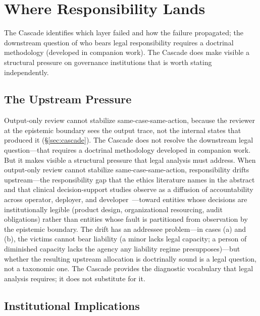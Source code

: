 \section{Where Responsibility Lands}\label{sec:responsibility}

The Cascade identifies which layer failed and how the failure propagated; the downstream question of who bears legal responsibility requires a doctrinal methodology (developed in companion work). The Cascade does make visible a structural pressure on governance institutions that is worth stating independently.

\subsection{The Upstream Pressure}

Output-only review cannot stabilize same-case-same-action, because the reviewer at the epistemic boundary sees the output trace, not the internal states that produced it (\S\ref{sec:cascade}). The Cascade does not resolve the downstream legal question---that requires a doctrinal methodology developed in companion work. But it makes visible a structural pressure that legal analysis must address. When output-only review cannot stabilize same-case-same-action, responsibility drifts upstream---the responsibility gap that the ethics literature names in the abstract~\cite{konigs2022} and that clinical decision-support studies observe as a diffusion of accountability across operator, deployer, and developer~\cite{bleher2022}---toward entities whose decisions are institutionally legible (product design, organizational resourcing, audit obligations) rather than entities whose fault is partitioned from observation by the epistemic boundary. The drift has an addressee problem---in cases (a) and (b), the victims cannot bear liability (a minor lacks legal capacity; a person of diminished capacity lacks the agency any liability regime presupposes)---but whether the resulting upstream allocation is doctrinally sound is a legal question, not a taxonomic one. The Cascade provides the diagnostic vocabulary that legal analysis requires; it does not substitute for it.

\subsection{Institutional Implications}

